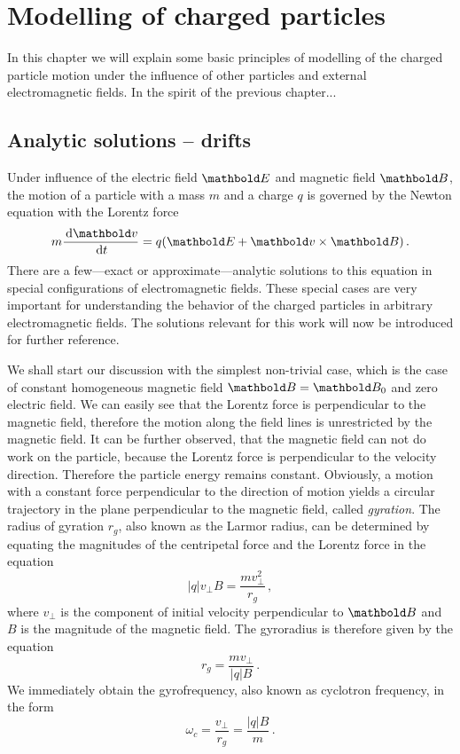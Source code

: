 
\chapter{Modelling of charged particles}


In this chapter we will explain some basic principles of modelling
of the charged particle motion under the influence of other particles
and external electromagnetic fields. In the spirit of the previous chapter...


\section{Analytic solutions -- drifts}

Under influence of the electric field $\mb E$ and magnetic field $\mb B$,
the motion of a particle with a mass $m$ and a charge $q$ is governed by
the Newton equation with the Lorentz force
\begin{equation}
    m\frac{\de \mb v}{\de t} = q(\mb E + \mb v\times\mb B)\,.
\end{equation}
There are a few---exact or approximate---analytic solutions to this
equation in special configurations of electromagnetic fields. These
special cases are very important for understanding the behavior of the
charged particles in arbitrary electromagnetic fields. The solutions
relevant for this work will now be introduced for further reference.

We shall start our discussion with the simplest non-trivial case,
which is the case of constant homogeneous magnetic field
$\mb B = \mb B_0$ and zero electric field.
We can easily see that the Lorentz force is
perpendicular to the magnetic field, therefore the motion along
the field lines is unrestricted by the magnetic field. It can be further
observed, that the magnetic field can not do work on the particle,
because the Lorentz force is perpendicular to the velocity direction.
Therefore the particle energy remains constant. Obviously, a motion
with a constant force perpendicular to the direction of motion
yields a circular trajectory in the plane perpendicular to the
magnetic field, called {\em gyration}. The radius of gyration $r_g$, also
known as the Larmor radius, can be
determined by equating the magnitudes of the centripetal force and the
Lorentz force in the equation
\begin{equation}
    |q|v_\perp B = \frac{mv_\perp^2}{r_g}\,,
\end{equation}
where $v_\perp$ is the component of initial velocity perpendicular to $\mb B$
and $B$ is the magnitude of the magnetic field. The gyroradius is therefore
given by the equation
\begin{equation}
    r_g = \frac{mv_\perp}{|q|B}\,.
    \label{eq:part:rg}
\end{equation}
We immediately obtain the gyrofrequency, also known as cyclotron frequency, in
the form
\begin{equation}
    \omega_c = \frac{v_\perp}{r_g} = \frac{|q|B}{m}\,.
    \label{eq:part:omegac}
\end{equation}

